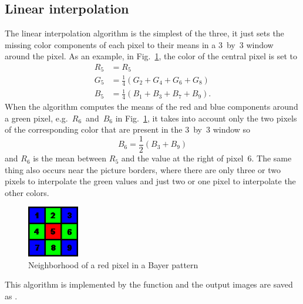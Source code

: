 \documentclass[a4paper,oneside]{article}
\begin{document}
\subsection{Linear interpolation}
\label{sec:linear}
The linear interpolation algorithm is the simplest of the three, it
just sets the missing color components of each pixel to their means in
a 3~by~3 window around the pixel.
%
As an example, in Fig.~\ref{fig:bayer_neigh}, the color of the central
pixel is set to
\begin{align*}
  R_5 &= R_5 \\
  G_5 &= \frac{1}{4}\left( G_2 + G_4 + G_6 + G_8 \right) \\
  B_5 &= \frac{1}{4}\left( B_1 + B_3 + B_7 + B_9 \right) .
\end{align*}
When the algorithm computes the means of the red and blue components
around a green pixel, e.g.~$R_6$~and~$B_6$ in
Fig.~\ref{fig:bayer_neigh}, it takes into account only the two pixels
of the corresponding color that are present in the 3~by~3 window so
\begin{equation*}
  B_6 = \frac{1}{2} \left( B_3 + B_9 \right)
\end{equation*}
and $R_6$ is the mean between $R_5$ and the value at the right of
pixel~6.
%
The same thing also occurs near the picture borders, where there are
only three or two pixels to interpolate the green values and just two
or one pixel to interpolate the other colors.
\begin{figure}[htbp]
  \centering
  \includegraphics[width=0.20\textwidth]{include_imgs/bayer_neigh}
  \caption{Neighborhood of a red pixel in a Bayer pattern}
  \label{fig:bayer_neigh}
\end{figure}

This algorithm is implemented by the function
 and the output images are saved as
.
\end{document}
